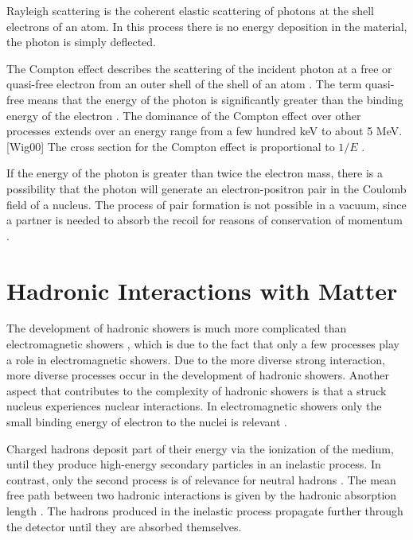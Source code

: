 \documentclass[12pt, a4paper]{thesis}
\begin{document}
Rayleigh scattering is the coherent elastic scattering of photons at
the shell electrons of an atom. In this process there is no energy
deposition in the material, the photon is simply deflected.

The Compton effect describes the scattering of the incident photon at
a free or quasi-free electron from an outer shell of the shell of an
atom \cite{wigman18}. The term quasi-free means that the energy of the
photon is significantly greater than the binding energy of the
electron \cite{kolanoski16}. The dominance of the Compton effect over
other processes extends over an energy range from a few hundred keV to
about 5 MeV.[Wig00] The cross section for the Compton effect is
proportional to $1/E$ \cite{wigman18}.

If the energy of the photon is greater than twice the electron mass,
there is a possibility that the photon will generate an
electron-positron pair in the Coulomb field of a nucleus. The process
of pair formation is not possible in a vacuum, since a partner is
needed to absorb the recoil for reasons of conservation of momentum
\cite{wigman18}.

\clearpage
\section{Hadronic Interactions with Matter}
\label{sec:org39e1a53}

The development of hadronic showers is much more complicated than
electromagnetic showers \cite{wigman18}, which is due to the fact that
only a few processes play a role in electromagnetic showers.  Due to
the more diverse strong interaction, more diverse processes occur in
the development of hadronic showers. Another aspect that contributes
to the complexity of hadronic showers is that a struck nucleus
experiences nuclear interactions. In electromagnetic showers only the
small binding energy of electron to the nuclei is relevant
\cite{wigman18}.

Charged hadrons deposit part of their energy via the ionization of the
medium, until they produce high-energy secondary particles in an
inelastic process.  In contrast, only the second process is of
relevance for neutral hadrons \cite{wigman18,fabjan03}. The mean free
path between two hadronic interactions is given by the hadronic
absorption length \cite{fabjan03}. The hadrons produced in the
inelastic process propagate further through the detector until they
are absorbed themselves.
\end{document}
